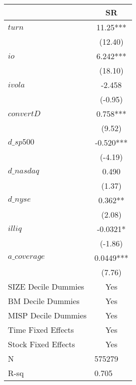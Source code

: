 \begin{tabular}{ll}
\toprule
        & \multicolumn{1}{c}{SR} \\
\midrule
$turn$  & \multicolumn{1}{c}{11.25***} \\
        & \multicolumn{1}{c}{(12.40)} \\
$io$    & \multicolumn{1}{c}{6.242***} \\
        & \multicolumn{1}{c}{(18.10)} \\
$ivola$ & \multicolumn{1}{c}{-2.458} \\
        & \multicolumn{1}{c}{(-0.95)} \\
$convertD$ & \multicolumn{1}{c}{0.758***} \\
        & \multicolumn{1}{c}{(9.52)} \\
$d\_sp500$ & \multicolumn{1}{c}{-0.520***} \\
        & \multicolumn{1}{c}{(-4.19)} \\
$d\_nasdaq$ & \multicolumn{1}{c}{0.490} \\
        & \multicolumn{1}{c}{(1.37)} \\
$d\_nyse$ & \multicolumn{1}{c}{0.362**} \\
        & \multicolumn{1}{c}{(2.08)} \\
$illiq$ & \multicolumn{1}{c}{-0.0321*} \\
        & \multicolumn{1}{c}{(-1.86)} \\
$a\_coverage$ & \multicolumn{1}{c}{0.0449***} \\
        & \multicolumn{1}{c}{(7.76)} \\
\midrule
SIZE Decile Dummies & \multicolumn{1}{c}{Yes} \\
BM Decile Dummies & \multicolumn{1}{c}{Yes} \\
MISP Decile Dummies & \multicolumn{1}{c}{Yes} \\
Time Fixed Effects & \multicolumn{1}{c}{Yes} \\
Stock Fixed Effects & \multicolumn{1}{c}{Yes} \\
N       & 575279 \\
R-sq    & 0.705 \\
\bottomrule
\end{tabular}%
